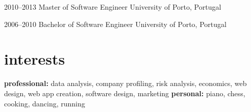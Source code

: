 \documentclass[]{friggeri-cv} %
\begin{document}
\begin{entrylist}


\entry
{2010--2013}
{Master {\normalfont of Software Engineer}}
{University of Porto, Portugal}
{}


\entry
{2006--2010}
{Bachelor {\normalfont of Software Engineer}}
{University of Porto, Portugal}
{}






\end{entrylist}


\section{interests}

\textbf{professional:} data analysis, company profiling, risk analysis, economics, web design, web app creation, software design, marketing \textbf{personal:} piano, chess, cooking, dancing, running
\end{document}

